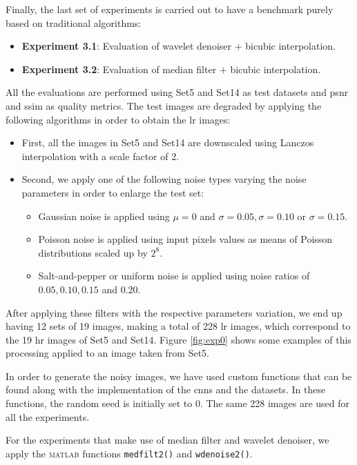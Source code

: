 Finally, the last set of experiments is carried out to have a benchmark purely based on traditional algorithms:
\begin{itemize}
\item \textbf{Experiment 3.1}:  Evaluation of wavelet denoiser $+$ bicubic interpolation.
\item \textbf{Experiment 3.2}:  Evaluation of median filter $+$ bicubic interpolation.
\end{itemize}



All the evaluations are performed using Set5 \cite{SET5} and Set14 \cite{SET14} as test datasets and \gls{psnr} and \gls{ssim} as quality metrics. The test images are degraded by applying the following algorithms in order to obtain the \gls{lr} images:

\begin{itemize}
	\item First, all the images in Set5 and Set14 are downscaled using Lanczos interpolation with a scale factor of 2. 
	\item Second, we apply one of the following noise types varying the noise parameters in order to enlarge the test set:
	\begin{itemize}
		\item Gaussian noise is applied using $\mu=0$ and $\sigma = 0.05, \sigma = 0.10$ or $\sigma = 0.15$.
		\item Poisson noise is applied using input pixels values as means of Poisson distributions scaled up by $2^8$.
		\item Salt-and-pepper or uniform noise is applied using noise ratios of $0.05, 0.10, 0.15$ and $0.20$.
	\end{itemize}
\end{itemize}

After applying these filters with the respective parameters variation, we end up having 12 sets of 19 images, making a total of 228 \gls{lr} images, which correspond to the 19 \gls{hr} images of Set5 and Set14. Figure \ref{fig:exp0} shows some examples of this processing applied to an image taken from Set5.


In order to generate the noisy images, we have used custom functions that can be found along with the implementation of the \glspl{cnn} and the datasets. In these functions, the random seed is initially set to 0. The same 228 images are used for all the experiments.

For the experiments that make use of median filter and wavelet denoiser, we apply the \textsc{matlab} functions \texttt{medfilt2()} and \texttt{wdenoise2()}.

